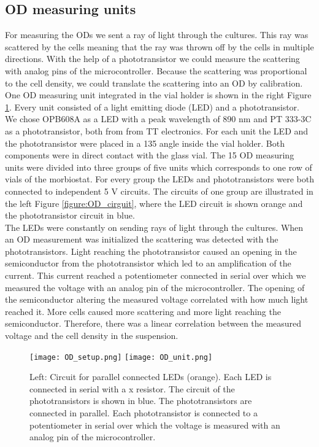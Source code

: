 \subsection{OD measuring units}
For measuring the ODs we sent a ray of light through the cultures. This ray was scattered by the cells meaning that the ray was thrown off by the cells in multiple directions. With the help of a phototransistor we could measure the scattering with analog pins of the microcontroller. Because the scattering was proportional to the cell density, we could translate the scattering into an OD by calibration. \\
One OD measuring unit integrated in the vial holder is shown in  the right Figure \ref{figure:OD_unit}. Every unit consisted of a light emitting diode (LED) and a phototransistor. We chose OPB608A as a LED with a peak wavelength of 890 nm and PT 333-3C as a phototransistor, both from from TT electronics. For each unit the LED and the phototransistor were placed in a 135 \degree \space angle inside the vial holder. Both components were in direct contact with the glass vial.
The 15 OD measuring units were divided into three groups of five units which corresponds to one row of vials of the morbiostat. For every group the LEDs and phototransistors were both connected to independent 5 V circuits. The circuits of one group are illustrated in the left Figure \ref{figure:OD_cirguit}, where the LED circuit is shown orange and the phototransistor circuit in blue. \\
The LEDs were constantly on sending rays of light through the cultures. When an OD measurement was initialized the scattering was detected with the phototransistors. Light reaching the phototransistor caused an opening in the semiconductor from the phototransistor which led to an amplification of the current. This current reached a potentiometer connected in serial over which we measured the voltage with an analog pin of the microcontroller. The opening of the semiconductor altering the measured voltage correlated with how much light reached it. More cells caused more scattering and more light reaching the semiconductor. Therefore, there was a linear correlation between the measured voltage and the cell density in the suspension. \\

\label{section:OD}
\begin{figure}
	\texttt{[image: OD\_setup.png]}
	\texttt{[image: OD\_unit.png]}
	\caption{Left: Circuit for parallel connected LEDs (orange). Each LED is connected in serial with a x \textOmega \space resistor. The circuit of the phototransistors is shown in blue. The phototransistors are connected in parallel. Each phototransistor is connected to a potentiometer in serial over which the voltage is measured with an analog pin of the microcontroller.}
	\label{figure:OD_cirguit}
	\label{figure:OD_unit}
\end{figure}

